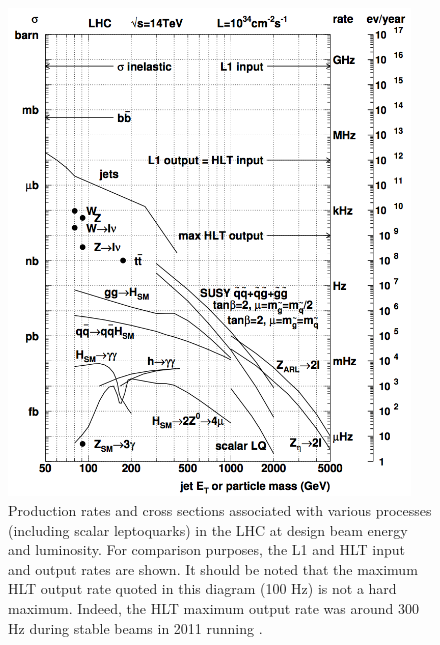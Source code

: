 \begin{figure}
  \centering
  \includegraphics[width=0.95\textwidth]{tex/cms/fig/trigger-xsections.png}
  \caption{Production rates and cross sections associated with various 
    processes (including scalar leptoquarks) 
    in the LHC at design beam energy and luminosity. 
    For comparison purposes, the L1 and HLT input and output rates are shown.  
    It should be noted that the maximum HLT output rate quoted in this diagram (100 Hz) 
    is not a hard maximum.  Indeed, the HLT maximum output rate was around 300 Hz 
    during stable beams in 2011 running \cite{cms-jinst}.}
  \label{fig:trigger-xsections}
\end{figure}

